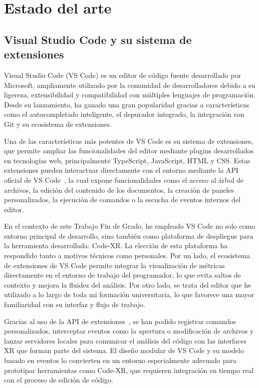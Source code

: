 \documentclass[a4paper, 12pt]{book}
\begin{document}
\cleardoublepage
\chapter{Estado del arte}
\label{chap:estado}

\section{Visual Studio Code y su sistema de extensiones}
\label{sec:vscode}

Visual Studio Code (VS Code) es un editor de código fuente desarrollado por Microsoft, ampliamente utilizado por la comunidad de desarrolladores debido a su ligereza, extensibilidad y compatibilidad con múltiples lenguajes de programación. Desde su lanzamiento, ha ganado una gran popularidad gracias a características como el autocompletado inteligente, el depurador integrado, la integración con Git y su ecosistema de extensiones.

Una de las características más potentes de VS Code es su sistema de extensiones, que permite ampliar las funcionalidades del editor mediante plugins desarrollados en tecnologías web, principalmente TypeScript, JavaScript, HTML y CSS. Estas extensiones pueden interactuar directamente con el entorno mediante la API oficial de VS Code~\cite{vscode-api}, la cual expone funcionalidades como el acceso al árbol de archivos, la edición del contenido de los documentos, la creación de paneles personalizados, la ejecución de comandos o la escucha de eventos internos del editor.

En el contexto de este Trabajo Fin de Grado, he empleado VS Code no solo como entorno principal de desarrollo, sino también como plataforma de despliegue para la herramienta desarrollada: Code-XR. La elección de esta plataforma ha respondido tanto a motivos técnicos como personales. Por un lado, el ecosistema de extensiones de VS Code permite integrar la visualización de métricas directamente en el entorno de trabajo del programador, lo que evita saltos de contexto y mejora la fluidez del análisis. Por otro lado, se trata del editor que he utilizado a lo largo de toda mi formación universitaria, lo que favorece una mayor familiaridad con su interfaz y flujo de trabajo.

Gracias al uso de la API de extensiones~\cite{vscode-api}, se han podido registrar comandos personalizados, interceptar eventos como la apertura o modificación de archivos y lanzar servidores locales para comunicar el análisis del código con las interfaces XR que forman parte del sistema. El diseño modular de VS Code y su modelo basado en eventos lo convierten en un entorno especialmente adecuado para prototipar herramientas como Code-XR, que requieren integración en tiempo real con el proceso de edición de código.
\end{document}
